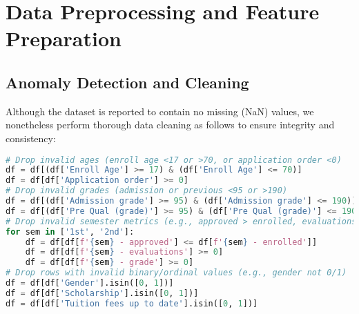 \documentclass[twoside,final]{hcmut-report}
\begin{document}
\section{Data Preprocessing and Feature Preparation}
\subsection{Anomaly Detection and Cleaning}
Although the dataset is reported to contain no missing (NaN) values, we nonetheless perform thorough data cleaning as follows to ensure integrity and consistency:
\begin{lstlisting}[language=python]
# Drop invalid ages (enroll age <17 or >70, or application order <0)
df = df[(df['Enroll Age'] >= 17) & (df['Enroll Age'] <= 70)]
df = df[df['Application order'] >= 0]
# Drop invalid grades (admission or previous <95 or >190)
df = df[(df['Admission grade'] >= 95) & (df['Admission grade'] <= 190)]
df = df[(df['Pre Qual (grade)'] >= 95) & (df['Pre Qual (grade)'] <= 190)]
# Drop invalid semester metrics (e.g., approved > enrolled, evaluations <0)
for sem in ['1st', '2nd']:
    df = df[df[f'{sem} - approved'] <= df[f'{sem} - enrolled']]
    df = df[df[f'{sem} - evaluations'] >= 0]
    df = df[df[f'{sem} - grade'] >= 0]
# Drop rows with invalid binary/ordinal values (e.g., gender not 0/1)
df = df[df['Gender'].isin([0, 1])]
df = df[df['Scholarship'].isin([0, 1])]
df = df[df['Tuition fees up to date'].isin([0, 1])]
\end{lstlisting}
\end{document}
